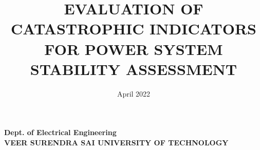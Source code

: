 \documentclass[12pt,oneside,a4paper]{Thesis_PG}
\begin{document}
\frontmatter      %
\begingroup
\makeatletter
\@twosidefalse
\makeatother


\title  {EVALUATION OF CATASTROPHIC INDICATORS FOR POWER SYSTEM STABILITY ASSESSMENT}
\addresses  {\groupname\\\deptname\\\univname}  %
\date       {April 2022}
\subject    {}
\keywords   {}

\maketitle




\pagestyle{fancy}  %

\begin{center}
\large \textbf{Dept. of Electrical Engineering}
\\\large \textbf{VEER SURENDRA SAI UNIVERSITY OF TECHNOLOGY}
\\{ }
\end{center} 
\end{document}
